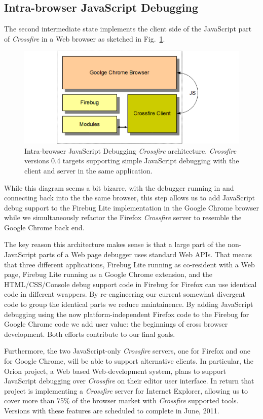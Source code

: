 \subsection{Intra-browser JavaScript Debugging}
The second intermediate state implements the client side of the JavaScript part
of \textit{Crossfire} in a Web browser as sketched in Fig.~\ref{fig:fbugChrome}.
\begin{figure}[htp]
  \includegraphics  [width = 86 mm] {figures/fbugChrome.png}
  \caption{Intra-browser JavaScript Debugging \textit{Crossfire} architecture.
\textit{Crossfire} versions 0.4 targets supporting simple JavaScript debugging with the client and server in the same application.}
 \label{fig:fbugChrome}
\end{figure}
While this diagram seems a bit bizarre, with the debugger running in and
connecting back into the the same browser, this step allows us to add JavaScript
debug support to the Firebug Lite implementation in the Google Chrome browser
while we simultaneously refactor the Firefox  \textit{Crossfire} server to
resemble the Google Chrome back end.


The key reason this architecture makes sense is that a large part of the
non-JavaScript parts of a Web page debugger uses standard Web APIs. That  means
that three different applications, Firebug Lite running as co-resident with a
Web page, Firebug Lite running as a Google Chrome extension,  and the
HTML/CSS/Console debug support code in Firebug for Firefox can use identical
code in different wrappers. By re-engineering our current somewhat divergent
code to group the identical parts we reduce maintainence. By adding
JavaScript debugging using the now platform-independent Firefox code to the
Firebug for Google Chrome code we add user value: the beginnings of cross
browser development. Both efforts contribute to our final goals.


Furthermore, the two JavaScript-only \textit{Crossfire} servers, one for Firefox
and one for Google Chrome, will be able to support alternative clients. In
particular, the Orion project, a Web based Web-development system, plans to
support JavaScript debugging over \textit{Crossfire} on their editor user
interface. In return that project is implementing a \textit{Crossfire} server
for Internet Explorer, allowing us to cover more than 75\% of the browser market
with \textit{Crossfire} supported tools. Versions with these features are scheduled
 to complete in
June, 2011.



